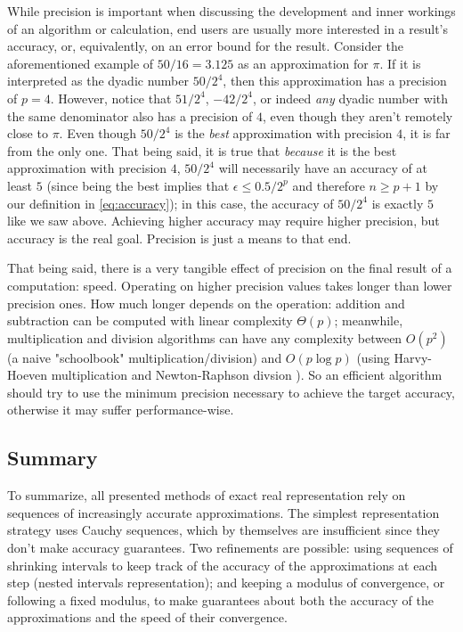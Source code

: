 While precision is important when discussing the development and inner workings of an algorithm or calculation, end users are usually more interested in a result's accuracy, or, equivalently, on an error bound for the result. Consider the aforementioned example of $50/16=3.125$ as an approximation for $\pi$. If it is interpreted as the dyadic number $50/2^4$, then this approximation has a precision of $p=4$. However, notice that $51/2^4$, $-42/2^4$, or indeed \textit{any} dyadic number with the same denominator also has a precision of $4$, even though they aren't remotely close to $\pi$. Even though $50/2^4$ is the \textit{best} approximation with precision $4$, it is far from the only one. That being said, it is true that \textit{because} it is the best approximation with precision $4$, $50/2^4$ will necessarily have an accuracy of at least $5$ (since being the best implies that $\epsilon \leq 0.5/2^{p}$ and therefore $n \geq p+1$ by our definition in \cref{eq:accuracy}); in this case, the accuracy of $50/2^4$ is exactly $5$ like we saw above. Achieving higher accuracy may require higher precision, but accuracy is the real goal. Precision is just a means to that end.

That being said, there is a very tangible effect of precision on the final result of a computation: speed. Operating on higher precision values takes longer than lower precision ones. How much longer depends on the operation: addition and subtraction can be computed with linear complexity $\Theta(p)$; meanwhile, multiplication and division algorithms can have any complexity between $O(p^2)$ (a naive "schoolbook" multiplication/division) and $O(p \log{p})$ (using Harvy-Hoeven multiplication \cite{harvey-2021} and Newton-Raphson divsion \cite{lancaster-1966}). So an efficient algorithm should try to use the minimum precision necessary to achieve the target accuracy, otherwise it may suffer performance-wise.



\subsection{Summary}
\label{sec:theory_summary}

To summarize, all presented methods of exact real representation rely on sequences of increasingly accurate approximations. The simplest representation strategy uses Cauchy sequences, which by themselves are insufficient since they don't make accuracy guarantees. Two refinements are possible: using sequences of shrinking intervals to keep track of the accuracy of the approximations at each step (nested intervals representation); and keeping a modulus of convergence, or following a fixed modulus, to make guarantees about both the accuracy of the approximations and the speed of their convergence.

